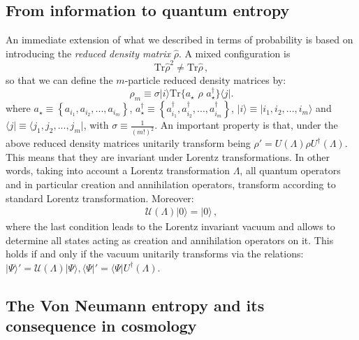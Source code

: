 \documentclass[nofootinbib,prd,superscriptaddress,showpacs,showkeys,]{revtex4}
\newcommand*{\ket}[1]{\ensuremath{|#1\rangle}}
\newcommand*{\bra}[1]{\ensuremath{\langle#1|}}
\begin{document}
\subsection{From information to quantum entropy}


An immediate extension of what we described in terms of probability is based on introducing the \emph{reduced density matrix} $\hat{\rho}$. A mixed configuration  is
\begin{equation}\label{mixed}
\text{Tr}\hat{\rho}^2 \neq \text{Tr} \hat{\rho}\,,
\end{equation}
so that we can define the $m$-particle reduced density matrices by:
\begin{equation}\label{e:yy}
  \rho_m \equiv \sigma\ket{i}\text{Tr}\{a_\star\,\,
  \rho\,\,a^\dag_\star \}\bra{j}.
\end{equation}
where $a_\star\equiv \left\{a_{i_1}, a_{i_2},...,a_{i_m}\right\}$, $a_\star^\dag\equiv \left\{a_{i_1}^\dag, a_{i_2}^\dag, ..., a_{i_m}^\dag\right\}$, $\ket{i}\equiv\ket{i_1, i_2, ..., i_m}$ and $\bra{j}\equiv \bra{j_1, j_{2}, ..., j_m}$, with $\sigma\equiv \frac{1}{(m!)^2}$.
An important property is that,  under the above  reduced density matrices unitarily transform being $\rho' = U(\Lambda)\rho U^\dag(\Lambda)$.  This means that they are  invariant under Lorentz transformations.
In other words,  taking into account a  Lorentz transformation $\Lambda$, all quantum operators and in particular creation and annihilation operators, transform according to  standard Lorentz transformation. Moreover:
\begin{eqnarray}
\mathcal U(\Lambda)\ket{0}=\ket{0}\,,
\end{eqnarray}
where the last condition leads to the Lorentz invariant vacuum and allows to determine all states acting as creation and annihilation operators on it. This holds if and only if the vacuum unitarily transforms via the relations: $ \ket{\Psi}' = \mathcal U(\Lambda)\ket{\Psi}, \bra{\Psi}'=\bra{\Psi}U^\dag(\Lambda)$.



\subsection{The Von Neumann entropy and its consequence in cosmology}
\end{document}
